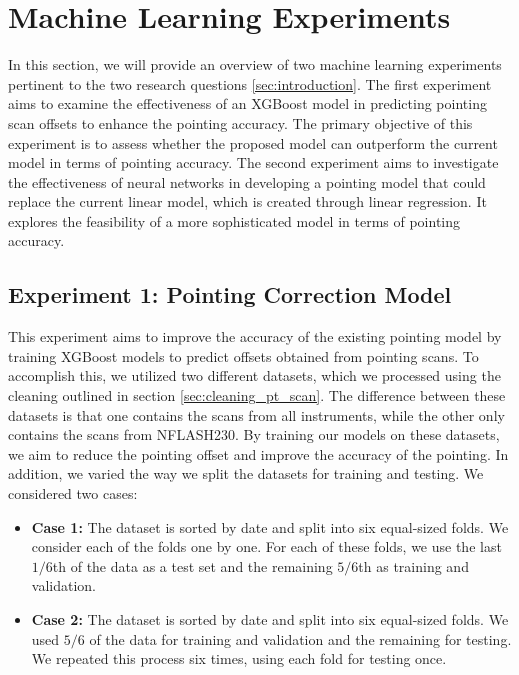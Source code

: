 \section{Machine Learning Experiments}\label{sec:ml_exp}
In this section, we will provide an overview of two machine learning experiments pertinent to the two research questions \ref{sec:introduction}.
The first experiment aims to examine the effectiveness of an XGBoost model in predicting pointing scan offsets to enhance the pointing accuracy.
The primary objective of this experiment is to assess whether the proposed model can outperform the current model in terms of pointing accuracy.
The second experiment aims to investigate the effectiveness of neural networks in developing a pointing model that could replace the current linear model, which is created through linear regression.
It explores the feasibility of a more sophisticated model in terms of pointing accuracy.

\subsection{Experiment 1: Pointing Correction Model}
This experiment aims to improve the accuracy of the existing pointing model by training XGBoost models to predict offsets obtained from pointing scans.
To accomplish this, we utilized two different datasets, which we processed using the cleaning outlined in section \ref{sec:cleaning_pt_scan}.
The difference between these datasets is that one contains the scans from all instruments, while the other only contains the scans from NFLASH230.
By training our models on these datasets, we aim to reduce the pointing offset and improve the accuracy of the pointing.
In addition, we varied the way we split the datasets for training and testing.
We considered two cases:

\begin{itemize}
    \item \textbf{Case 1:} The dataset is sorted by date and split into six equal-sized folds.
    We consider each of the folds one by one.
    For each of these folds, we use the last $1/6$th of the data as a test set and the remaining $5/6$th as training and validation.
    \item \textbf{Case 2:} The dataset is sorted by date and split into six equal-sized folds.
    We used $5/6$ of the data for training and validation and the remaining for testing.
    We repeated this process six times, using each fold for testing once.
\end{itemize}

